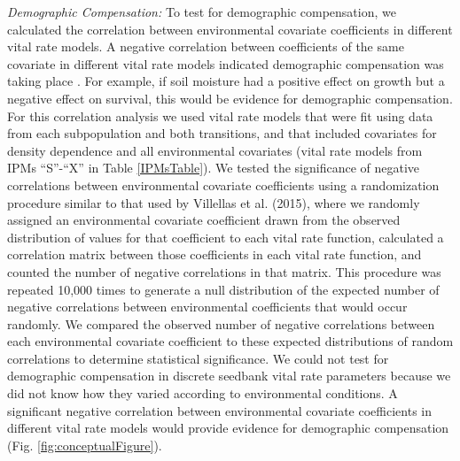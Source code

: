 \documentclass[12pt, letterpaper]{article}
\begin{document}
\textit{Demographic Compensation:} To test for demographic compensation, we calculated the correlation between environmental covariate coefficients in different vital rate models. A negative correlation between coefficients of the same covariate in different vital rate models indicated demographic compensation was taking place \cite{Villellas2015DemographicImplications, Dibner2019}. For example, if soil moisture had a positive effect on growth but a negative effect on survival, this would be evidence for demographic compensation. For this correlation analysis we used vital rate models that were fit using data from each subpopulation and both transitions, and that included covariates for density dependence and all environmental covariates (vital rate models from IPMs “S”-“X” in Table \ref{IPMsTable}). We tested the significance of negative correlations between environmental covariate coefficients using a randomization procedure similar to that used by Villellas et al. (2015), where we randomly assigned an environmental covariate coefficient drawn from the observed distribution of values for that coefficient to each vital rate function, calculated a correlation matrix between those coefficients in each vital rate function, and counted the number of negative correlations in that matrix. This procedure was repeated 10,000 times to generate a null distribution of the expected number of negative correlations between environmental coefficients that would occur randomly. We compared the observed number of negative correlations between each environmental covariate coefficient to these expected distributions of random correlations to determine statistical significance. We could not test for demographic compensation in discrete seedbank vital rate parameters because we did not know how they varied according to environmental conditions.  A significant negative correlation between environmental covariate coefficients in different vital rate models would provide evidence for demographic compensation (Fig. \ref{fig:conceptualFigure}).  
\end{document}
